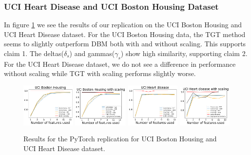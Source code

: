 \subsubsection{UCI Heart Disease and UCI Boston Housing Dataset}
In figure \ref{fig:pt_heart_housing} we see the results of our replication on the UCI Boston Housing and UCI Heart Disease dataset. For the UCI Boston Housing data, the TGT method seems to slightly outperform DBM both with and without scaling. This supports claim 1. The deltas($\delta_s$) and gammas($\gamma_s$) show high similarity, supporting claim 2. For the UCI Heart Disease dataset, we do not see a difference in performance without scaling while TGT with scaling performs slightly worse.
\begin{figure}[H]
    \includegraphics[width=0.24\textwidth]{../openreview/images/ptfigures/housing-tradeoff.png}
    \includegraphics[width=0.244\textwidth]{../openreview/images/ptfigures/housing-scaling-tradeoff.png}
    \includegraphics[width=0.24\textwidth]{../openreview/images/ptfigures/heart-tradeoff.png}
    \includegraphics[width=0.24\textwidth]{../openreview/images/ptfigures/heartscaling-tradeoff.png}
    \caption{Results for the PyTorch replication for UCI Boston Housing and UCI Heart Disease dataset.}
    \label{fig:pt_heart_housing}
\end{figure}

